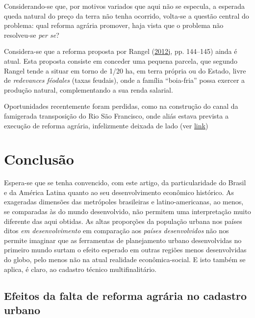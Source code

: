 \documentclass[a4paper, 12pt]{article}
\begin{document}
Considerando-se que, por motivos variados que aqui não se especula, a
esperada queda natural do preço da terra não tenha ocorrido, volta-se a
questão central do problema: qual reforma agrária promover, haja vista
que o problema não resolveu-se \emph{per se}?

Considera-se que a reforma proposta por Rangel
(\protect\hyperlink{ref-rangel1986c}{2012}\protect\hyperlink{ref-rangel1986c}{j},
pp. 144--145) ainda é atual. Esta proposta consiste em conceder uma
pequena parcela, que segundo Rangel tende a situar em torno de 1/20 ha,
em terra própria ou do Estado, livre de \emph{redevances féodales}
(taxas feudais), onde a família ``boia-fria'' possa exercer a produção
natural, complementando a sua renda salarial.

Oportunidades recentemente foram perdidas, como na construção do canal
da famigerada transposição do Rio São Francisco, onde aliás estava
prevista a execução de reforma agrária, infelizmente deixada de lado
(ver
\href{https://extra.globo.com/noticias/brasil/incra-integracao-do-sao-francisco-pode-ajudar-reforma-agraria-736897.html}{link})

\hypertarget{conclusao}{%
\section{Conclusão}\label{conclusao}}

Espera-se que se tenha convencido, com este artigo, da particularidade
do Brasil e da América Latina quanto ao seu desenvolvimento econômico
histórico. As exageradas dimensões das metrópoles brasileiras e
latino-americanas, ao menos, se comparadas às do mundo desenvolvido, não
permitem uma interpretação muito diferente das aqui obtidas. As altas
proporções da população urbana nos países ditos \emph{em
desenvolvimento} em comparação aos \emph{países desenvolvidos} não nos
permite imaginar que as ferramentas de planejamento urbano desenvolvidas
no primeiro mundo surtam o efeito esperado em outras regiões menos
desenvolvidas do globo, pelo menos não na atual realidade
econômica-social. E isto também se aplica, é claro, ao cadastro técnico
multifinalitário.

\hypertarget{efeitos-da-falta-de-reforma-agraria-no-cadastro-urbano}{%
\subsection{Efeitos da falta de reforma agrária no cadastro
urbano}\label{efeitos-da-falta-de-reforma-agraria-no-cadastro-urbano}}
\end{document}
